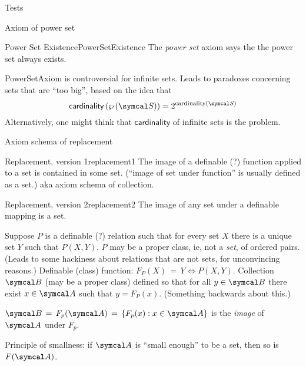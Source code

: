\documentclass{PalisadesLakesArticle}
\begin{document}
\begin{plSection}{Tests}
\begin{plSection}{Axiom of power set}
\begin{plAxiom}{Power Set Existence}{PowerSetExistence}
The \textsl{power set} axiom says the the power set
always exists.~\cite{wiki:AxiomOfPowerSet}
\end{plAxiom}

\begin{plNote}{}{PowerSetAxiom}
 is controversial for infinite sets. 
Leads to paradoxes concerning sets that are ``too big'',
based on the idea that 
\begin{equation}
 \mathsf{cardinality}\left(\PowerSet{\Set{S}}\right)
 = 2^{\text{cardinality}(\Set{S})}
\end{equation}
Alternatively, one might think that $\mathsf{cardinality}$ of
infinite sets is the problem.
\end{plNote}

\end{plSection}%
\begin{plSection}{Axiom schema of replacement}
\label{sec:Axiom-schema-of-replacement}

\begin{plAxiomSchema}{Replacement, version 1}{replacement1}
The image of a definable (?) function applied to a set
is contained in some set.\cite{wiki:AxiomSchemaOfReplacement}
(``image of set under function'' is usually defined as a set.)
aka axiom schema of collection.
\end{plAxiomSchema}%

\begin{plAxiomSchema}{Replacement, version 2}{replacement2}
The image of any set under a definable mapping is a set.

Suppose $P$ is a definable (?) relation such that for every
set $X$ there is a unique set $Y$ such that $P(X,Y)$.
$P$ may be a proper class\cite{wiki:ClassSetTheory}, 
ie, not a \textit{set}, of ordered pairs. 
(Leads to some hackiness about relations that are not sets,
for unconvincing reasons\cite{wiki:BinaryRelation}.)
Definable (class) function: $F_P(X)\,=\,Y \iff P(X,Y)$.
Collection $\Set{B}$ (may be a proper class)
defined so that for all $y\in\Set{B}$ there exist $x \in \Set{A}$
such that $y=F_P(x)$.
(Something backwards about this.)

$\Set{B}\,=\,F_p(\Set{A}) \,=\, \{F_p(x) : x \in \Set{A}\}$ 
is the \textsl{image} of $\Set{A}$ under $F_p$.

Principle of smallness: if $\Set{A}$ is 
``small enough'' to be a set,
then so is $F(\Set{A})$.
\end{plAxiomSchema}%


\end{plSection}
\end{plSection}
\end{document}
